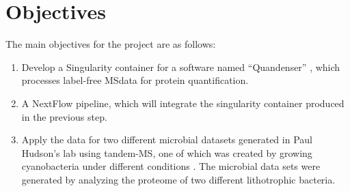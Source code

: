 \section{Objectives}

The main objectives for the project are as follows:
\begin{enumerate}
\item Develop a Singularity container for a software named “Quandenser” \cite{quandenser}, which processes label-free MSdata for protein quantification.
\item A NextFlow pipeline, which will integrate the singularity container produced in the previous step.
\item Apply the data for two different microbial datasets generated in Paul Hudson’s lab using tandem-MS, one of which was created by growing cyanobacteria under different conditions \cite{michael}. The microbial data sets were generated by analyzing the proteome of two different lithotrophic bacteria.
\end{enumerate}
